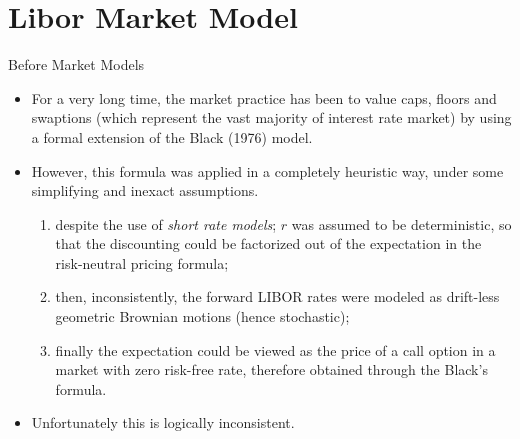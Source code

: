 \documentclass{beamer}
\begin{document}
\section{Libor Market Model}
\begin{frame}{Before Market Models}
	\begin{itemize}
		\item<1-> For a very long time, the market practice has been to value caps, floors and swaptions (which represent the vast majority of interest rate market) by using a formal extension of the Black (1976) model.
		\item<2-> However, this formula was applied in a completely heuristic way, under some simplifying and inexact assumptions.
		\begin{enumerate}
			\item<3-> despite the use of \emph{short rate models}; $r$ was assumed to be deterministic, so that the discounting could be factorized out of the expectation in the risk-neutral pricing formula;
			\item<4-> then, inconsistently, the forward LIBOR rates were modeled as drift-less geometric Brownian motions (hence stochastic);
			\item<5-> finally the expectation could be viewed as the price of a call option in a market with zero risk-free rate, therefore obtained through the Black’s formula.
		\end{enumerate}
		\item<6-> \textcolor{maincolor}{Unfortunately this is logically inconsistent.}
	\end{itemize}
\end{frame}
\end{document}

